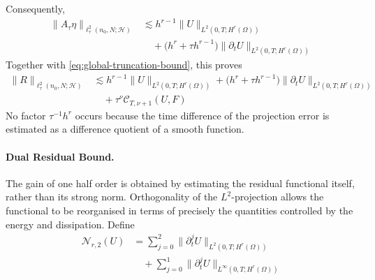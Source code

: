 \documentclass[11pt]{article}
\begin{document}
Consequently,
\begin{align}
\|A_{\tau}\eta\|_{\ell_{\tau}^2(n_0,N;\mathcal H)}
&\lesssim h^{r-1}\|U\|_{L^2(0,T;H^r(\Omega))}
\label{eq:strong-projection-residual-space}\\
&\quad+\bigl(h^r+\tau h^{r-1}\bigr)
\|\partial_tU\|_{L^2(0,T;H^r(\Omega))}
\label{eq:strong-projection-residual-time}
\end{align}
Together with \eqref{eq:global-truncation-bound}, this proves
\begin{align}
\|R\|_{\ell_{\tau}^2(n_0,N;\mathcal H)}
&\lesssim h^{r-1}\|U\|_{L^2(0,T;H^r(\Omega))}
+\bigl(h^r+\tau h^{r-1}\bigr)
\|\partial_tU\|_{L^2(0,T;H^r(\Omega))}
\label{eq:strong-residual-bound-space}\\
&\quad+\tau^\nu\mathcal C_{T,\nu+1}(U,F) \label{eq:strong-residual-bound-time}
\end{align}
No factor \(\tau^{-1}h^r\) occurs because the time difference of the
projection error is estimated as a difference quotient of a smooth function.

\paragraph{Dual Residual Bound.}
The gain of one half order is obtained by estimating the residual functional
itself, rather than its strong norm. Orthogonality of the \(L^2\)-projection
allows the functional to be reorganised in terms of precisely the quantities
controlled by the energy and dissipation. Define
\begin{align}
\mathcal N_{r,2}(U)
&=\sum_{j=0}^{2}\|\partial_t^jU\|_{L^2(0,T;H^r(\Omega))}
\label{eq:dual-regularity-l2}\\
&\quad+\sum_{j=0}^{1}\|\partial_t^jU\|_{L^{\infty}(0,T;H^r(\Omega))}
\label{eq:dual-regularity-uniform}
\end{align}
\end{document}
